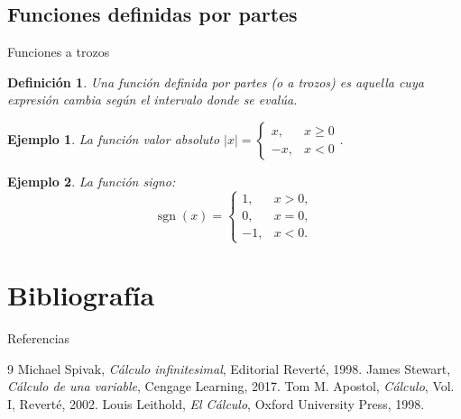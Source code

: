 \documentclass[10pt, spanish]{beamer}
\newtheorem{definicion}{Definición}
\newtheorem{ejemplo}{Ejemplo}
\begin{document}
	\subsection{Funciones definidas por partes}
	\begin{frame}{Funciones a trozos}
		\begin{definicion}
			Una función \textit{definida por partes} (o a trozos) es aquella cuya expresión cambia según el intervalo donde se evalúa.
		\end{definicion}
		\begin{ejemplo}
			La función valor absoluto $|x| = \begin{cases} x, & x\ge 0 \\ -x, & x<0 \end{cases}$.
		\end{ejemplo}
		\begin{ejemplo}
			La función signo:
			\[
			\operatorname{sgn}(x) = \begin{cases}
				1, & x>0,\\
				0, & x=0,\\
				-1, & x<0.
			\end{cases}
			\]
		\end{ejemplo}
	\end{frame}
	
	\section{Bibliografía}
	\begin{frame}{Referencias}
		\begin{thebibliography}{9}
			 Michael Spivak, \textit{Cálculo infinitesimal}, Editorial Reverté, 1998.
			 James Stewart, \textit{Cálculo de una variable}, Cengage Learning, 2017.
			 Tom M. Apostol, \textit{Cálculo}, Vol. I, Reverté, 2002.
			 Louis Leithold, \textit{El Cálculo}, Oxford University Press, 1998.
		\end{thebibliography}
	\end{frame}
	
\end{document}
